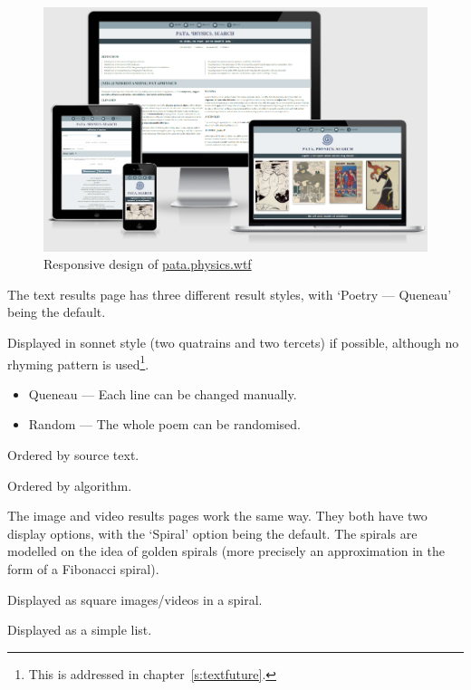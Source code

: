 \begin{figure}[!htbp] %
  \centering
  \includegraphics[width=\linewidth]{images/proto3screen}
\caption[Responsive design of \url{pata.physics.wtf}]{Responsive design of \url{pata.physics.wtf}}
\label{img:proto3screen}
\end{figure}

The text results page has three different result styles, with `Poetry --- Queneau' being the default.

\begin{description}[leftmargin=2.8cm]
  \item [Poetry] Displayed in sonnet style (two quatrains and two tercets) if possible, although no rhyming pattern is used\footnote{This is addressed in chapter~\ref{s:textfuture}.}.
    \begin{itemize}
      \item Queneau --- Each line can be changed manually.
      \item Random --- The whole poem can be randomised.
    \end{itemize}
  \item [Sources] Ordered by source text.
  \item [Algorithms] Ordered by algorithm.
\end{description}

The image and video results pages work the same way. They both have two display options, with the `Spiral' option being the default. The spirals are modelled on the idea of golden spirals (more precisely an approximation in the form of a Fibonacci spiral).

\begin{description}[leftmargin=1.8cm]
  \item [Spiral] Displayed as square images/videos in a spiral.
  \item [List] Displayed as a simple list.
\end{description}

